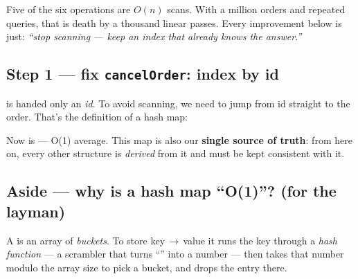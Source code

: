\begin{intu}
Five of the six operations are $O(n)$ scans. With a million orders and repeated
queries, that is death by a thousand linear passes. Every improvement below is
just: \emph{``stop scanning --- keep an index that already knows the answer.''}
\end{intu}

\subsection{Step 1 --- fix \texttt{cancelOrder}: index by id}

 is handed only an \emph{id}. To avoid scanning, we need to jump
from id straight to the order. That's the definition of a hash map:

\begin{center}
\end{center}

Now  is  --- O(1) average. This map is
also our \textbf{single source of truth}: from here on, every other structure is
\emph{derived} from it and must be kept consistent with it.

\subsection*{Aside --- why is a hash map ``O(1)''? (for the layman)}

A  is an array of \emph{buckets}. To store key\,$\to$\,value
it runs the key through a \emph{hash function} --- a scrambler that turns
``'' into a number --- then takes that number modulo the array size to
pick a bucket, and drops the entry there.

\begin{center}
\end{center}

